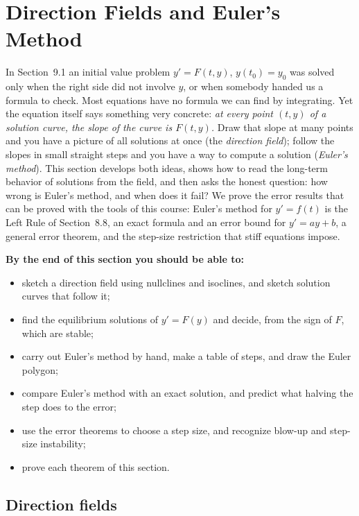 \documentclass[11pt]{article}
\begin{document}
\section{Direction Fields and Euler's Method}

\begin{guide}
In Section~9.1 an initial value problem $y'=F(t,y)$, $y(t_0)=y_0$ was solved only when the right side did not involve $y$, or when somebody handed us a formula to check. Most equations have no formula we can find by integrating. Yet the equation itself says something very concrete: \emph{at every point $(t,y)$ of a solution curve, the slope of the curve is $F(t,y)$.} Draw that slope at many points and you have a picture of all solutions at once (the \emph{direction field}); follow the slopes in small straight steps and you have a way to compute a solution (\emph{Euler's method}). This section develops both ideas, shows how to read the long-term behavior of solutions from the field, and then asks the honest question: how wrong is Euler's method, and when does it fail? We prove the error results that can be proved with the tools of this course: Euler's method for $y'=f(t)$ is the Left Rule of Section~8.8, an exact formula and an error bound for $y'=ay+b$, a general error theorem, and the step-size restriction that stiff equations impose.
\end{guide}

\textbf{By the end of this section you should be able to:}
\begin{itemize}
  \item sketch a direction field using nullclines and isoclines, and sketch solution curves that follow it;
  \item find the equilibrium solutions of $y'=F(y)$ and decide, from the sign of $F$, which are stable;
  \item carry out Euler's method by hand, make a table of steps, and draw the Euler polygon;
  \item compare Euler's method with an exact solution, and predict what halving the step does to the error;
  \item use the error theorems to choose a step size, and recognize blow-up and step-size instability;
  \item prove each theorem of this section.
\end{itemize}

\subsection*{Direction fields}
\end{document}
